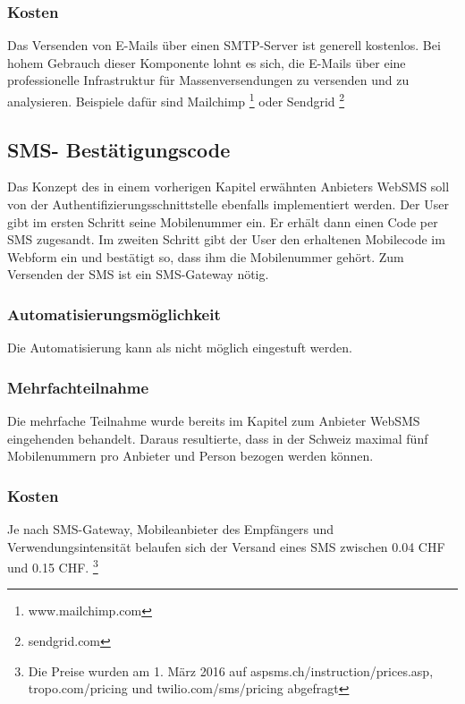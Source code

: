 \subsubsection{Kosten}\label{kosten-3}

Das Versenden von E-Mails über einen SMTP-Server ist generell kostenlos.
Bei hohem Gebrauch dieser Komponente lohnt es sich, die E-Mails über
eine professionelle Infrastruktur für Massenversendungen zu versenden
und zu analysieren. Beispiele dafür sind Mailchimp \footnote{www.mailchimp.com}
oder Sendgrid \footnote{sendgrid.com}

\subsection{SMS- Bestätigungscode}\label{sms--bestuxe4tigungscode}

Das Konzept des in einem vorherigen Kapitel erwähnten Anbieters WebSMS
soll von der Authentifizierungsschnittstelle ebenfalls implementiert
werden. Der User gibt im ersten Schritt seine Mobilenummer ein. Er
erhält dann einen Code per SMS zugesandt. Im zweiten Schritt gibt der
User den erhaltenen Mobilecode im Webform ein und bestätigt so, dass ihm
die Mobilenummer gehört. Zum Versenden der SMS ist ein SMS-Gateway
nötig.

\subsubsection{Automatisierungsmöglichkeit}\label{automatisierungsmuxf6glichkeit-3}

Die Automatisierung kann als nicht möglich eingestuft werden.

\subsubsection{Mehrfachteilnahme}\label{mehrfachteilnahme-3}

Die mehrfache Teilnahme wurde bereits im Kapitel zum Anbieter WebSMS
eingehenden behandelt. Daraus resultierte, dass in der Schweiz maximal
fünf Mobilenummern pro Anbieter und Person bezogen werden können.

\subsubsection{Kosten}\label{kosten-4}

Je nach SMS-Gateway, Mobileanbieter des Empfängers und
Verwendungsintensität belaufen sich der Versand eines SMS zwischen 0.04
CHF und 0.15 CHF. \footnote{Die Preise wurden am 1. März 2016 auf
  aspsms.ch/instruction/prices.asp, tropo.com/pricing und
  twilio.com/sms/pricing abgefragt}

